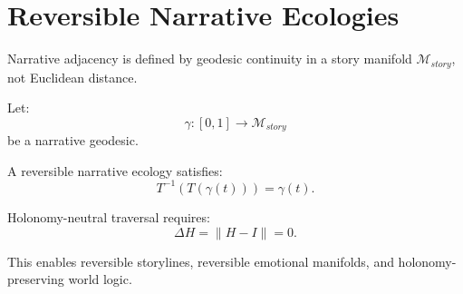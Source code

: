 \section*{Reversible Narrative Ecologies}

Narrative adjacency is defined by geodesic continuity in a story manifold
$\mathcal{M}_{story}$, not Euclidean distance.

Let:
\[
\gamma : [0,1] \to \mathcal{M}_{story}
\]
be a narrative geodesic.

A reversible narrative ecology satisfies:
\[
T^{-1}(T(\gamma(t))) = \gamma(t).
\]

Holonomy-neutral traversal requires:
\[
\Delta H = \|H - I\| = 0.
\]

This enables reversible storylines, reversible emotional manifolds, and
holonomy-preserving world logic.
